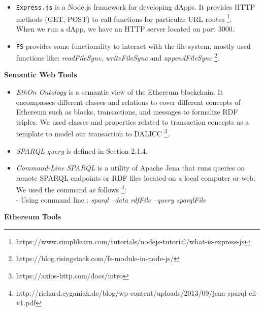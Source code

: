 \begin{itemize}
HDWalletProvider provides a custom URL: 'http://127.0.0.1:7545'. This will spawn a development blockchain locally on port 7545 \footnote{https://github.com/trufflesuite/truffle-hdwallet-provider}. \\
\item \texttt{Express.js} is a Node.js framework for developing dApps. It provides HTTP methods (GET, POST) to call functions for particular URL routes \footnote{https://www.simplilearn.com/tutorials/nodejs-tutorial/what-is-express-js}. \\ 
When we run a dApp, we have an HTTP server located on port 3000. \\
\item \texttt{FS} provides some functionality to interact with the file system, mostly used functions like: \textit{readFileSync}, \textit{writeFileSync} and \textit{appendFileSync} \footnote{https://blog.risingstack.com/fs-module-in-node-js/}. \\
\end{itemize}

\textbf{Semantic Web Tools}\\
\begin{itemize}
	\item \textit{EthOn Ontology} is a semantic view of the Ethereum blockchain. It encompasses different classes and relations to cover different concepts of Ethereum such as blocks, transactions, and messages to formalize RDF triples. We used classes and properties related to transaction concepts as a template to model our transaction to DALICC \footnote{https://axios-http.com/docs/intro}.
	\item \textit{SPARQL query} is defined in Section 2.1.4.
	\item \textit{Command-Line SPARQL} is a utility of Apache Jena that runs queries on remote SPARQL endpoints or RDF files located on a local computer or web. We used the command as follows \footnote{http://richard.cyganiak.de/blog/wp-content/uploads/2013/09/jena-sparql-cli-v1.pdf}:\\
	 - Using command line : \textit{sparql --data rdfFile --query sparqlFile}
\end{itemize}
\textbf{Ethereum Tools}

